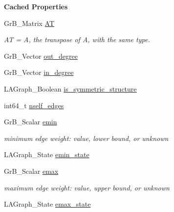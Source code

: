 \begin{Indent}\textbf{ Cached Properties}\par
\begin{DoxyCompactItemize}
\item 
\mbox{\label{structLAGraph__Graph__struct_a18d4dcbaf21aebefdd92aa815f7859b2}} 
Gr\+B\+\_\+\+Matrix \hyperlink{structLAGraph__Graph__struct_a18d4dcbaf21aebefdd92aa815f7859b2}{AT}
\begin{DoxyCompactList}\small\item\em AT = A\textquotesingle{}, the transpose of A, with the same type. \end{DoxyCompactList}\item 
Gr\+B\+\_\+\+Vector \hyperlink{structLAGraph__Graph__struct_a80f2da5366a6f2395b91b158d5ee509c}{out\+\_\+degree}
\item 
Gr\+B\+\_\+\+Vector \hyperlink{structLAGraph__Graph__struct_aa076ad742dc43f1caf1197c285abde44}{in\+\_\+degree}
\item 
L\+A\+Graph\+\_\+\+Boolean \hyperlink{structLAGraph__Graph__struct_aefb37c8aac85f1688aa5e460a574ef36}{is\+\_\+symmetric\+\_\+structure}
\item 
int64\+\_\+t \hyperlink{structLAGraph__Graph__struct_a39076f3755c663cd382bcf8a935dbf0a}{nself\+\_\+edges}
\item 
\mbox{\label{structLAGraph__Graph__struct_a7d7ba0cd10b9d40abab4a4812c7256e3}} 
Gr\+B\+\_\+\+Scalar \hyperlink{structLAGraph__Graph__struct_a7d7ba0cd10b9d40abab4a4812c7256e3}{emin}
\begin{DoxyCompactList}\small\item\em minimum edge weight\+: value, lower bound, or unknown \end{DoxyCompactList}\item 
L\+A\+Graph\+\_\+\+State \hyperlink{structLAGraph__Graph__struct_ad86508a1f8b0c38fd7420d28b2cff430}{emin\+\_\+state}
\item 
\mbox{\label{structLAGraph__Graph__struct_a63ecd7e2b4340cfcb0e50e9d1020ac31}} 
Gr\+B\+\_\+\+Scalar \hyperlink{structLAGraph__Graph__struct_a63ecd7e2b4340cfcb0e50e9d1020ac31}{emax}
\begin{DoxyCompactList}\small\item\em maximum edge weight\+: value, upper bound, or unknown \end{DoxyCompactList}\item 
L\+A\+Graph\+\_\+\+State \hyperlink{structLAGraph__Graph__struct_ad7bf05c8e88d308e233428d059c52111}{emax\+\_\+state}
\end{DoxyCompactItemize}
\end{Indent}


